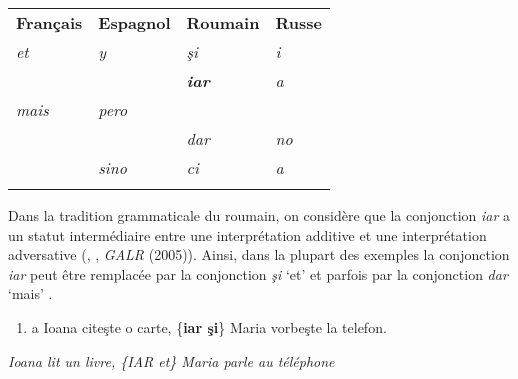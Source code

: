 \begin{table}


\begin{tabular}{llll}

 {\bfseries Français}\par & {\bfseries Espagnol}\par & {\bfseries Roumain}\par & {\bfseries Russe}\par\\
 {\itshape et}\par & {\itshape y}\par & {\itshape şi}\par & {\itshape i}\par\\
 &  & {\bfseries\itshape iar}\par & {\itshape a}\par\\
 {\itshape mais}\par & {\itshape pero}\par &  & \\
 &  & {\itshape dar}\par & {\itshape no}\par\\
\hhline{~---} & {\itshape sino}\par & {\itshape ci}\par & {\itshape a}\par\\
\hhline{~---}

\end{tabular}

\caption{}
\end{table}

Dans la tradition grammaticale du roumain, on considère que la conjonction \textit{iar} a un statut intermédiaire entre une interprétation additive et une interprétation adversative (\citet{Niculescu1965}, \citet{Zafiu2005}, \textit{GALR} (2005)). Ainsi, dans la plupart des exemples la conjonction \textit{iar} peut être remplacée par la conjonction \textit{şi} `et'  et parfois par la conjonction \textit{dar} `mais' . 


\begin{enumerate}
\item \label{bkm:Ref301963738}a  Ioana citeşte o carte, \{\textbf{iar {\textbar} şi}\} Maria vorbeşte la telefon.


\end{enumerate}
{\itshape
Ioana lit un livre, \{IAR {\textbar} et\} Maria parle au téléphone} 

